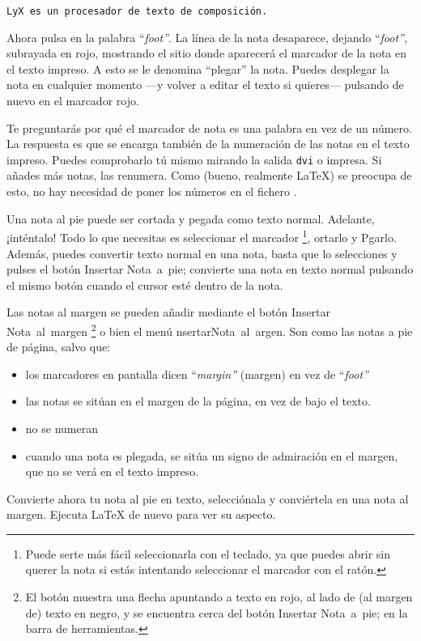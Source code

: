 \begin{verbatim}
LyX es un procesador de texto de composición.
\end{verbatim}
Ahora pulsa en la palabra {}``\emph{foot''}. La línea de la nota
desaparece, dejando {}``\emph{foot'',} subrayada en rojo, mostrando
el sitio donde aparecerá el marcador de la nota en el texto impreso.
A esto se le denomina {}``plegar'' la nota. Puedes desplegar la
nota en cualquier momento ---y volver a editar el texto si quieres---
pulsando de nuevo en el marcador rojo.

Te preguntarás por qué el marcador de nota es una palabra en vez de
un número. La respuesta es que \LyX{} se encarga también de la numeración
de las notas en el texto impreso. Puedes comprobarlo tú mismo mirando
la salida \texttt{dvi} o impresa. Si añades más notas, \LyX{} las
renumera. Como \LyX{} (bueno, realmente \LaTeX{}) se preocupa de esto,
no hay necesidad de poner los números en el fichero \LyX{}.

Una nota al pie puede ser cortada y pegada como texto normal. Adelante,
¡inténtalo! Todo lo que necesitas es seleccionar el marcador%
\footnote{Puede serte más fácil seleccionarla con el teclado, ya que puedes
abrir sin querer la nota si estás intentando seleccionar el marcador
con el ratón.%
}, \textsf{}\textsf{ortar}lo y \textsf{P}\textsf{}\textsf{gar}lo.
Además, puedes convertir texto normal en una nota, basta que lo selecciones
y pulses el botón \textsf{Insertar Nota~a~pie}; convierte una nota
en texto normal pulsando el mismo botón cuando el cursor esté dentro
de la nota.

Las notas al margen se pueden añadir mediante el botón \textsf{Insertar
Nota~al~margen}%
\footnote{El botón muestra una flecha apuntando a texto en rojo, al lado de
(al margen de) texto en negro, y se encuentra cerca del botón \textsf{Insertar
Nota~a~pie}; en la barra de herramientas.%
} \textsf{o bien el menú} \textsf{}\textsf{nsertar\lyxarrow{}Nota~al~}\textsf{}\textsf{argen}\@.
Son como las notas a pie de página, salvo que:

\begin{itemize}
\item los marcadores en pantalla dicen {}``\emph{margin''} (margen) en
vez de {}``\emph{foot''}
\item las notas se sitúan en el margen de la página, en vez de bajo el texto.
\item no se numeran
\item cuando una nota es plegada, se sitúa un signo de admiración en el
margen, que no se verá en el texto impreso.
\end{itemize}
Convierte ahora tu nota al pie en texto, selecciónala y conviértela
en una nota al margen. Ejecuta \LaTeX{} de nuevo para ver su aspecto.

